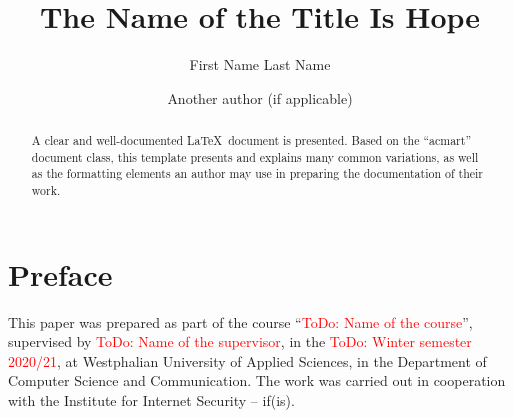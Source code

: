 \documentclass[sigconf, 11pt,urlbreakonhyphens=true,balance=true,manuscript,nonacm]{acmart}
\newcommand{\todo}[1]{\textcolor{red}{{ToDo: #1}}}
\begin{document}
\title{The Name of the Title Is Hope}

\author{First Name Last Name}

\author{Another author (if applicable)}

\renewcommand{\shortauthors}{First Name Last Name}

\begin{abstract}
  A clear and well-documented \LaTeX\ document is presented. 
  Based on the ``acmart'' document class, this template presents and explains many common variations, as well as the formatting elements an author may use in preparing the documentation of their work.
\end{abstract}




\maketitle

\section*{Preface}
This paper was prepared as part of the course ``\todo{Name of the course}'', supervised by \todo{Name of the supervisor}, in the \todo{Winter semester 2020/21}, at Westphalian University of Applied Sciences, in the Department of Computer Science and Communication. The work was carried out in cooperation with the Institute for Internet Security -- if(is).
\end{document}
